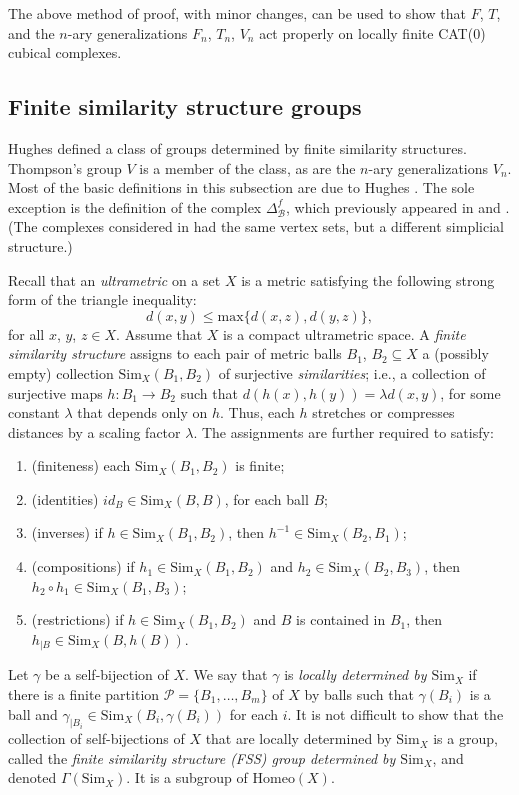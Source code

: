 \documentclass{amsart}
\newtheorem{standing assumption}[theorem]{Standing Assumption}
\begin{document}
The above method of proof, with minor changes, can be used to show that $F$, $T$, and the $n$-ary generalizations $F_{n}$, $T_{n}$, $V_{n}$ act properly on  
locally finite CAT(0) cubical complexes. 

\subsection{Finite similarity structure groups}

Hughes \cite{Hughes} defined a class of groups determined by finite similarity structures. Thompson's group $V$ is a member of the class, as are the $n$-ary generalizations $V_{n}$. Most of the basic definitions in this subsection are due to Hughes \cite{Hughes}. The sole exception is the definition of the complex $\Delta^{f}_{\mathcal{B}}$, which previously appeared in \cite{Farley} and \cite{FH2}. (The complexes considered in \cite{FH1} had the same vertex sets, but a different simplicial structure.) 

 Recall that an \emph{ultrametric} on a set $X$ is a metric satisfying the following strong form of the triangle inequality:
\[ d(x,y) \leq \mathrm{max}\{ d(x,z), d(y,z) \}, \]
for all $x$, $y$, $z \in X$. Assume that $X$ is a compact ultrametric space. A \emph{finite similarity structure} assigns to each pair of metric balls $B_{1}$, $B_{2} \subseteq X$ a (possibly empty) collection
$\mathrm{Sim}_{X}(B_{1}, B_{2})$ of surjective \emph{similarities}; i.e., a collection of surjective maps
$h: B_{1} \rightarrow B_{2}$ such that $d(h(x),h(y)) = \lambda d(x,y)$, for some constant $\lambda$ that depends only on $h$. Thus, each $h$ stretches or compresses distances by a scaling factor $\lambda$. The assignments are further required to satisfy:
\begin{enumerate}
\item (finiteness) each $\mathrm{Sim}_{X}(B_{1},B_{2})$ is finite;
\item (identities) $id_{B} \in \mathrm{Sim}_{X}(B,B)$, for each ball $B$;
\item (inverses) if $h \in \mathrm{Sim}_{X}(B_{1}, B_{2})$, then $h^{-1} \in \mathrm{Sim}_{X}(B_{2},B_{1})$;
\item (compositions) if $h_{1} \in \mathrm{Sim}_{X}(B_{1},B_{2})$ and 
$h_{2} \in \mathrm{Sim}_{X}(B_{2},B_{3})$,
then $h_{2} \circ h_{1} \in \mathrm{Sim}_{X}(B_{1},B_{3})$;
\item (restrictions) if $h \in \mathrm{Sim}_{X}(B_{1}, B_{2})$ and $B$ is contained in $B_{1}$, then
$h_{\mid B} \in \mathrm{Sim}_{X}(B, h(B))$.
\end{enumerate}
Let $\gamma$ be a self-bijection of $X$.  We say that $\gamma$ is \emph{locally determined by $\mathrm{Sim}_{X}$} if there is a finite partition $\mathcal{P} = \{ B_{1}, \ldots, B_{m} \}$  of $X$ by balls such that
$\gamma(B_{i})$ is a ball and
$\gamma_{\mid B_{i}} \in \mathrm{Sim}_{X}(B_{i}, \gamma(B_{i}))$ for each $i$. It is not difficult to show that the collection of self-bijections of $X$ that are locally determined by $\mathrm{Sim}_{X}$ is a group, called the \emph{finite similarity structure (FSS) group determined by $\mathrm{Sim}_{X}$}, and 
denoted $\Gamma(\mathrm{Sim}_{X})$. It is a subgroup of $\mathrm{Homeo}(X)$. 
\end{document}
